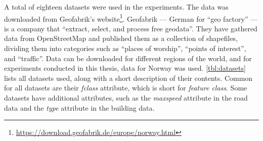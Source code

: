 \begin{comment}
        \midrule
        Outdoor Recreation Areas                  & The purpose of the dataset is to provide an overview of areas that are important for the public's outdoor life, and it should be easy to account for which assessments and criteria have been the basis for the work and the final product.                                                       \\
        \midrule
        Cultural Monuments - Protected Buildings  & Buildings and churches that are automatically, decision, regulation, or temporarily protected under law and churches that have the status as listed.                                                                                                                                              \\
        \midrule
        Flood Zones                               & Flood zones show areas that are flooded by different flood sizes (recurrence interval). Flood zones are prepared for 20-, 200-, and 1000-year floods.                                                                                                                                             \\
        \midrule
        Quick Clay Zones                          & Provides an overview of zones with potential danger (precautionary areas) for major quick clay landslides.                                                                                                                                                                                        \\
        \bottomrule
    \end{tabularx}
\end{table}

\end{comment}

A total of eighteen datasets were used in the experiments. The data was downloaded from Geofabrik's website\footnote{\url{https://download.geofabrik.de/europe/norway.html}}. Geofabrik --- German for \enquote{geo factory} --- is a company that \enquote{extract, select, and process free geodata}. They have gathered data from OpenStreetMap and published them as a collection of shapefiles, dividing them into categories such as \enquote{places of worship}, \enquote{points of interest}, and \enquote{traffic}. Data can be downloaded for different regions of the world, and for experiments conducted in this thesis, data for Norway was used. \autoref{tbl:datasets} lists all datasets used, along with a short description of their contents. Common for all datasets are their \emph{fclass} attribute, which is short for \emph{feature class}. Some datasets have additional attributes, such as the \emph{maxspeed} attribute in the road data and the \emph{type} attribute in the building data.

